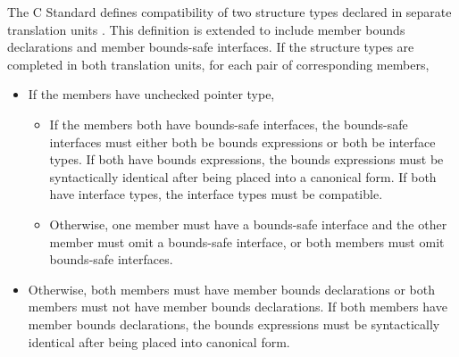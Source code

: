 The C Standard defines compatibility of two structure types declared in
separate translation units \cite[Section 6.2.7]{ISO2011}.  This definition
is extended to include member bounds declarations and member bounds-safe
interfaces.  If the structure types are completed in both translation
units, for each pair of corresponding members,
\begin{itemize}
\item If the members have unchecked pointer type,
\begin{itemize}
\item If the members both have bounds-safe interfaces, the bounds-safe
interfaces must either both be bounds expressions or both be interface
types. If both have bounds expressions, the bounds expressions must be
syntactically identical after being placed into a canonical form.
If both have interface types, the interface types must be compatible.
\item Otherwise,  one member must have a bounds-safe interface and the
other member must omit a bounds-safe interface, or both members must omit
bounds-safe interfaces.
\end{itemize}
\item Otherwise, both members must have member bounds declarations or both
members must not have member bounds declarations.  If both members have
member bounds declarations, the bounds expressions must be syntactically
identical after being placed into canonical form.
\end{itemize}
